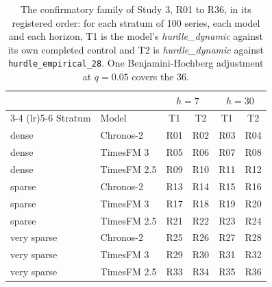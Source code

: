 \begin{table}[htbp]
\centering\small
\caption{The confirmatory family of Study 3, R01 to R36, in its registered order: for each stratum of 100
series, each model and each horizon, T1 is the model's \emph{hurdle\_dynamic} against its own completed
control and T2 is \emph{hurdle\_dynamic} against \texttt{hurdle\_empirical\_28}. One Benjamini-Hochberg
adjustment at $q = 0.05$ covers the 36.}
\label{tab:s3structure}
\begin{tabular}{llcccc}
\toprule
 & & \multicolumn{2}{c}{$h = 7$} & \multicolumn{2}{c}{$h = 30$} \\
\cmidrule(lr){3-4} \cmidrule(lr){5-6}
Stratum & Model & T1 & T2 & T1 & T2 \\
\midrule
dense & Chronos-2 & R01 & R02 & R03 & R04 \\
dense & TimesFM 3 & R05 & R06 & R07 & R08 \\
dense & TimesFM 2.5 & R09 & R10 & R11 & R12 \\
sparse & Chronos-2 & R13 & R14 & R15 & R16 \\
sparse & TimesFM 3 & R17 & R18 & R19 & R20 \\
sparse & TimesFM 2.5 & R21 & R22 & R23 & R24 \\
very sparse & Chronos-2 & R25 & R26 & R27 & R28 \\
very sparse & TimesFM 3 & R29 & R30 & R31 & R32 \\
very sparse & TimesFM 2.5 & R33 & R34 & R35 & R36 \\
\bottomrule
\end{tabular}
\end{table}

